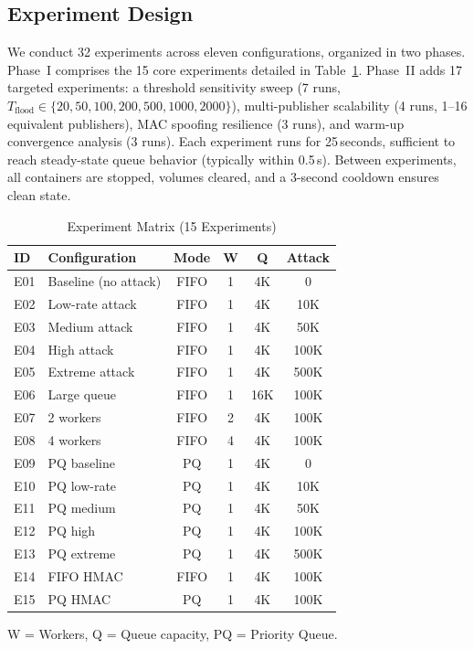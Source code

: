 \documentclass[journal]{IEEEtran}
\begin{document}
\subsection{Experiment Design}
We conduct 32 experiments across eleven configurations, organized in two phases. Phase~I comprises the 15 core experiments detailed in Table~\ref{tab:experiments}. Phase~II adds 17 targeted experiments: a threshold sensitivity sweep (7 runs, $T_{\text{flood}} \in \{20, 50, 100, 200, 500, 1000, 2000\}$), multi-publisher scalability (4 runs, 1--16 equivalent publishers), MAC spoofing resilience (3 runs), and warm-up convergence analysis (3 runs). Each experiment runs for 25\,seconds, sufficient to reach steady-state queue behavior (typically within 0.5\,s). Between experiments, all containers are stopped, volumes cleared, and a 3-second cooldown ensures clean state.

\begin{table}[t]
\caption{Experiment Matrix (15 Experiments)}
\label{tab:experiments}
\centering
\small
\begin{tabular}{llcccc}
\toprule
\textbf{ID} & \textbf{Configuration} & \textbf{Mode} & \textbf{W} & \textbf{Q} & \textbf{Attack} \\
\midrule
E01 & Baseline (no attack) & FIFO & 1 & 4K & 0 \\
E02 & Low-rate attack & FIFO & 1 & 4K & 10K \\
E03 & Medium attack & FIFO & 1 & 4K & 50K \\
E04 & High attack & FIFO & 1 & 4K & 100K \\
E05 & Extreme attack & FIFO & 1 & 4K & 500K \\
\midrule
E06 & Large queue & FIFO & 1 & 16K & 100K \\
\midrule
E07 & 2 workers & FIFO & 2 & 4K & 100K \\
E08 & 4 workers & FIFO & 4 & 4K & 100K \\
\midrule
E09 & PQ baseline & PQ & 1 & 4K & 0 \\
E10 & PQ low-rate & PQ & 1 & 4K & 10K \\
E11 & PQ medium & PQ & 1 & 4K & 50K \\
E12 & PQ high & PQ & 1 & 4K & 100K \\
E13 & PQ extreme & PQ & 1 & 4K & 500K \\
\midrule
E14 & FIFO HMAC & FIFO & 1 & 4K & 100K \\
E15 & PQ HMAC & PQ & 1 & 4K & 100K \\
\bottomrule
\end{tabular}
\vspace{1mm}
\small{W = Workers, Q = Queue capacity, PQ = Priority Queue.}
\end{table}
\end{document}
